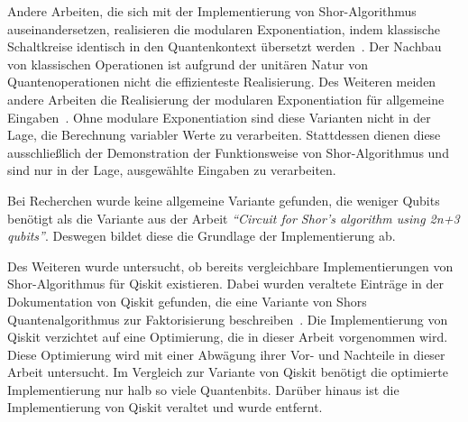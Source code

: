 Andere Arbeiten, die sich mit der Implementierung von Shor-Algorithmus auseinandersetzen,
realisieren die modularen Exponentiation, 
indem klassische Schaltkreise identisch in den Quantenkontext übersetzt werden~\cite{Vedral_1996}.
Der Nachbau von klassischen Operationen ist aufgrund der unitären Natur von Quantenoperationen nicht die effizienteste Realisierung.
Des Weiteren meiden andere Arbeiten die Realisierung der modularen Exponentiation für allgemeine Eingaben~\cite{9376169,9686492}. 
Ohne modulare Exponentiation sind diese Varianten nicht in der Lage, 
die Berechnung variabler Werte zu verarbeiten.
Stattdessen dienen diese ausschließlich der Demonstration der Funktionsweise von Shor-Algorithmus und
sind nur in der Lage, ausgewählte Eingaben zu verarbeiten.

Bei Recherchen wurde keine allgemeine Variante gefunden,
die weniger Qubits benötigt als die Variante aus der Arbeit \textit{"`Circuit for Shor’s algorithm using 2n+3 qubits"'}.
Deswegen bildet diese die Grundlage der Implementierung ab.

Des Weiteren wurde untersucht, 
ob bereits vergleichbare Implementierungen von Shor-Algorithmus für Qiskit existieren. 
Dabei wurden veraltete Einträge in der Dokumentation von Qiskit gefunden, 
die eine Variante von Shors Quantenalgorithmus zur Faktorisierung beschreiben~\cite{QiskitShorImplementations}. 
Die Implementierung von Qiskit verzichtet auf eine Optimierung, die in dieser Arbeit vorgenommen wird. 
Diese Optimierung wird mit einer Abwägung ihrer Vor- und Nachteile in dieser Arbeit untersucht. 
Im Vergleich zur Variante von Qiskit benötigt die optimierte Implementierung nur halb so viele Quantenbits. 
Darüber hinaus ist die Implementierung von Qiskit veraltet und wurde entfernt.
